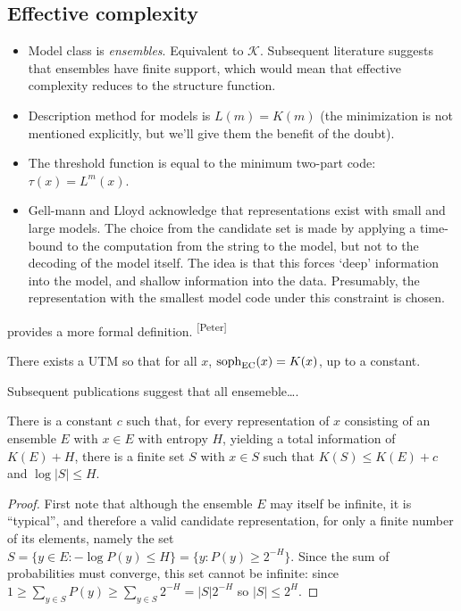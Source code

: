 \documentclass{style/llncs}
\newcommand{\K}{\mathscr K}
\newcommand{\tn}[1]{\textnormal{#1}}
\newcommand{\s}{\tn{soph}}
\newcommand{\pb}[1]{\textcolor{OliveGreen}{\small #1 \textsuperscript{[Peter]} }}
\begin{document}
\subsection{Effective complexity}

\begin{itemize}
\item Model class is \emph{ensembles}. Equivalent to $\K$. Subsequent literature suggests that ensembles have finite support, which would mean that effective complexity reduces to the structure function.
\item Description method for models is $L(m) = K(m)$ (the minimization is not mentioned explicitly, but we'll give them the benefit of the doubt).
\item The threshold function is equal to the minimum two-part code: $\tau(x)=L^m(x)$.
\item Gell-mann and Lloyd acknowledge that representations exist with small and large models. The choice from the candidate set is made by applying a time-bound to the computation from the string to the model, but not to the decoding of the model itself. The idea is that this forces `deep' information into the model, and shallow information into the data. Presumably, the representation with the smallest model code under this constraint is chosen.   
\end{itemize} 

\pb{\cite{ay2010effective} provides a more formal definition.}
\begin{theorem}
There exists a UTM so that for all $x$, $\s_\text{EC}(x) = K(x)$, up to a constant. 
\end{theorem}

Subsequent publications suggest that all ensemeble\ldots.  

\begin{theorem}
  There is a constant $c$ such that, for every representation of $x$
  consisting of an ensemble $E$ with $x\in E$ with entropy $H$,
  yielding a total information of $K(E)+H$, there is a finite set $S$
  with $x\in S$ such that $K(S)\le K(E)+c$ and $\log|S|\le H$.
\end{theorem}
\begin{proof}
  First note that although the ensemble $E$ may itself be infinite, it
  is ``typical'', and therefore a valid candidate representation, for
  only a finite number of its elements, namely the set $S=\{y\in E:-\log
  P(y)\le H\} = \{y:P(y)\ge 2^{-H}\}$. Since the sum of probabilities must
  converge, this set cannot be infinite: since $1\ge\sum_{y\in S} P(y)\ge
  \sum_{y\in S}2^{-H} = |S|2^{-H}$ so $|S|\le 2^H$.
\end{proof}
\end{document}
